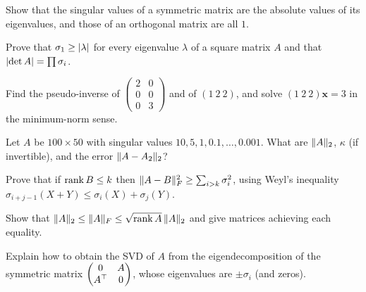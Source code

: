 \begin{exercise}
Show that the singular values of a symmetric matrix are the absolute values of its eigenvalues, and those of an orthogonal matrix are all $1$.
\end{exercise}

\begin{exercise}
Prove that $\sigma_1\ge\lvert\lambda\rvert$ for every eigenvalue $\lambda$ of a square matrix $A$ and that $\lvert\det A\rvert=\prod\sigma_i$.
\end{exercise}

\begin{exercise}
Find the pseudo-inverse of $\begin{pmatrix}2&0\\0&0\\0&3\end{pmatrix}$ and of $(1\ 2\ 2)$, and solve $(1\ 2\ 2)\mathbf{x}=3$ in the minimum-norm sense.
\end{exercise}

\begin{exercise}
Let $A$ be $100\times 50$ with singular values $10,5,1,0.1,\dots,0.001$. What are $\lVert A\rVert_2$, $\kappa$ (if invertible), and the error $\lVert A-A_2\rVert_2$?
\end{exercise}

\begin{exercise}
Prove that if $\operatorname{rank} B\le k$ then $\lVert A-B\rVert_F^2\ge\sum_{i>k}\sigma_i^2$, using Weyl's inequality $\sigma_{i+j-1}(X+Y)\le\sigma_i(X)+\sigma_j(Y)$.
\end{exercise}

\begin{exercise}
Show that $\lVert A\rVert_2\le\lVert A\rVert_F\le\sqrt{\operatorname{rank} A}\,\lVert A\rVert_2$ and give matrices achieving each equality.
\end{exercise}

\begin{exercise}
Explain how to obtain the SVD of $A$ from the eigendecomposition of the symmetric matrix $\begin{pmatrix}0&A\\A^{\top}&0\end{pmatrix}$, whose eigenvalues are $\pm\sigma_i$ (and zeros).
\end{exercise}
